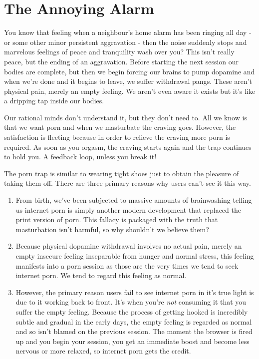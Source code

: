 \documentclass[
]{book}
\begin{document}
\hypertarget{the-annoying-alarm}{%
\section{The Annoying Alarm}\label{the-annoying-alarm}}

You know that feeling when a neighbour's home alarm has been ringing all day - or some other minor persistent aggravation - then the noise suddenly stops and marvelous feelings of peace and tranquility wash over you? This isn't really peace, but the ending of an aggravation. Before starting the next session our bodies are complete, but then we begin forcing our brains to pump dopamine and when we're done and it begins to leave, we suffer withdrawal pangs. These aren't physical pain, merely an empty feeling. We aren't even aware it exists but it's like a dripping tap inside our bodies.

Our rational minds don't understand it, but they don't need to. All we know is that we want porn and when we masturbate the craving goes. However, the satisfaction is fleeting because in order to relieve the craving more porn is required. As soon as you orgasm, the craving starts again and the trap continues to hold you. A feedback loop, unless you break it!

The porn trap is similar to wearing tight shoes just to obtain the pleasure of taking them off. There are three primary reasons why users can't see it this way.

\begin{enumerate}
\def\labelenumi{\arabic{enumi}.}
\item
  From birth, we've been subjected to massive amounts of brainwashing telling us internet porn is simply another modern development that replaced the print version of porn. This fallacy is packaged with the truth that masturbation isn't harmful, so why shouldn't we believe them?
\item
  Because physical dopamine withdrawal involves no actual pain, merely an empty insecure feeling inseparable from hunger and normal stress, this feeling manifests into a porn session as those are the very times we tend to seek internet porn. We tend to regard this feeling as normal.
\item
  However, the primary reason users fail to see internet porn in it's true light is due to it working back to front. It's when you're \emph{not} consuming it that you suffer the empty feeling. Because the process of getting hooked is incredibly subtle and gradual in the early days, the empty feeling is regarded as normal and so isn't blamed on the previous session. The moment the browser is fired up and you begin your session, you get an immediate boost and become less nervous or more relaxed, so internet porn gets the credit.
\end{enumerate}
\end{document}

